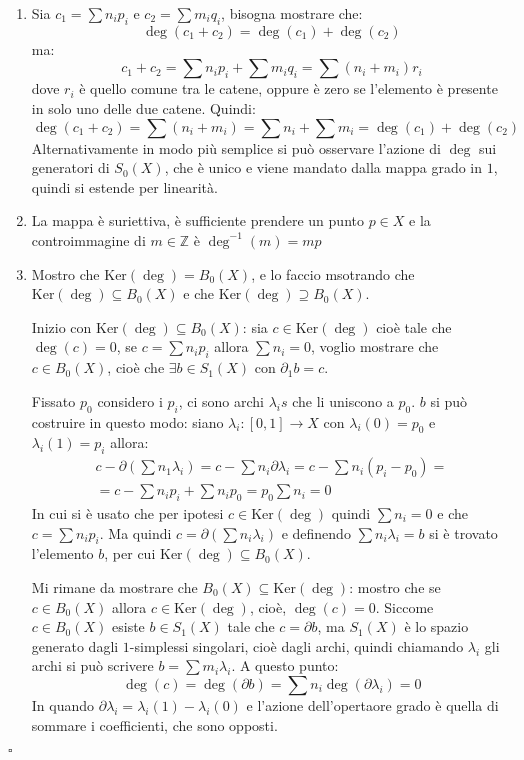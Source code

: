 \documentclass[10pt, twoside=false, x11names]{scrbook}
\newenvironment{proof}{{\textbf{Dimostrazione}:}}{\hfill $\square$}
\newcommand{\Z}{\mathbb{Z}}
\renewcommand{\ker}[1]{\mathrm{Ker}( #1)}
\begin{document}
\begin{proof}
  \begin{enumerate}
  \item
    Sia $ c_1 = \sum n_i p_i $ e $ c_2 = \sum m_i q_i $, bisogna mostrare che:
    \[
      \deg(c_1 + c_2) = \deg(c_1) + \deg(c_2)
    \]
    ma:
    \[
      c_1 + c_2 = \sum n_i p_i + \sum m_i q_i = \sum (n_i + m_i)r_i
    \]
    dove $ r_i $ è quello comune tra le catene, oppure è zero se
    l'elemento è presente in solo uno delle due catene.
    Quindi:
    \[
      \deg(c_1 + c_2) = \sum (n_i + m_i) = \sum n_i + \sum m_i = \deg(c_1) + \deg(c_2)
    \]
    Alternativamente in modo più semplice si può osservare l'azione di $ \deg $ sui generatori di $ S_0(X) $,
    che è unico e viene mandato dalla mappa grado in $ 1 $, quindi si estende per linearità.
  \item
    La mappa è suriettiva, è sufficiente prendere un punto $ p \in X $
    e la controimmagine di $ m \in \Z $ è $ \deg^{-1}(m) = mp $
  \item
    Mostro che $ \ker{\deg} = B_0(X) $, e lo faccio msotrando che $ \ker{\deg} \subseteq B_0(X) $
    e che  $ \ker{\deg} \supseteq B_0(X) $.

    Inizio con $ \ker{\deg} \subseteq B_0(X) $: sia $ c \in \ker{\deg} $ cioè tale che $ \deg(c) = 0 $,
    se $ c = \sum n_i p_i $ allora $ \sum n_i = 0 $, voglio mostrare che $ c \in B_0(X) $,
    cioè che $ \exists b \in S_1(X) $ con $ \partial_1 b = c $.

    Fissato $ p_0 $ considero i $ p_i $, ci sono archi
    $ \lambda_i s $ che li uniscono a $ p_0 $. $ b $ si può costruire in questo modo: siano
    $ \lambda_i : [0,1] \to X $ con $ \lambda_i(0) = p_0 $ e $ \lambda_i(1) = p_i $ allora:
    \begin{gather*}
      c - \partial\left(\sum n_1 \lambda_i \right) =  c - \sum n_i \partial \lambda_i = c - \sum n_i (p_i - p_0) = \\
      = c - \sum n_i p_i
      + \sum n_i p_0 = p_0 \sum n_i = 0
    \end{gather*}
    In cui si è usato che per ipotesi $ c \in \ker{\deg} $ quindi $ \sum n_i = 0 $ e che $ c = \sum n_i p_i  $.
    Ma quindi $ c = \partial(\sum n_i \lambda_i) $ e definendo $ \sum n_i \lambda_i = b $ si è trovato l'elemento $ b $,
    per cui $ \ker{\deg} \subseteq B_0(X) $.

    Mi rimane da mostrare che $ B_0(X) \subseteq \ker{\deg} $: mostro che se $ c \in B_0(X) $ allora
    $ c \in \ker{\deg} $, cioè, $ \deg(c) = 0 $.
    Siccome $ c \in B_0(X) $ esiste $ b \in S_1(X) $ tale che $ c = \partial b $, ma $ S_1(X) $
    è lo spazio generato dagli $ 1 $-simplessi singolari, cioè dagli archi, quindi
    chiamando $ \lambda_i $ gli archi si può scrivere $ b = \sum m_i \lambda_i $.
    A questo punto:
    \[
      \deg(c) = \deg(\partial b) = \sum n_i \deg(\partial \lambda_i) = 0
    \]
    In quando $ \partial \lambda_i = \lambda_i(1) - \lambda_i(0) $ e l'azione dell'opertaore grado è quella di sommare i coefficienti,
    che sono opposti.


\end{enumerate}
\end{proof}
\end{document}
